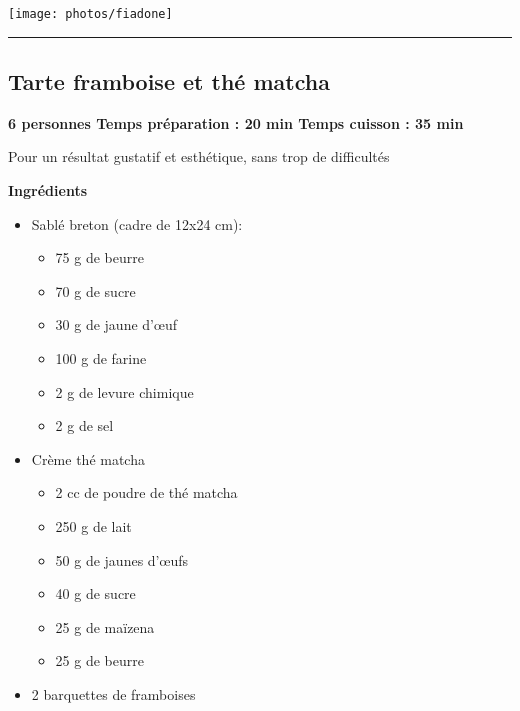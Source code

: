 \documentclass[]{book}
\providecommand{\tightlist}{%
  \setlength{\itemsep}{0pt}\setlength{\parskip}{0pt}}
\begin{document}
\begin{center}\texttt{[image: photos/fiadone]} \end{center}

\begin{center}\rule{0.5\linewidth}{0.5pt}\end{center}

\subsection*{\texorpdfstring{{Tarte framboise et thé
matcha}}{Tarte framboise et thé matcha}}\label{tarte-framboise-et-thuxe9-matcha}

\begin{sucrebox}
\textbf{6 personnes \textbar{} Temps préparation : 20 min \textbar{}
Temps cuisson : 35 min}

Pour un résultat gustatif et esthétique, sans trop de difficultés
\end{sucrebox}

\textbf{Ingrédients}

\begin{itemize}
\tightlist
\item
  Sablé breton (cadre de 12x24 cm):

  \begin{itemize}
  \tightlist
  \item
    75 g de beurre
  \item
    70 g de sucre
  \item
    30 g de jaune d'œuf
  \item
    100 g de farine
  \item
    2 g de levure chimique
  \item
    2 g de sel
  \end{itemize}
\item
  Crème thé matcha

  \begin{itemize}
  \tightlist
  \item
    2 cc de poudre de thé matcha
  \item
    250 g de lait
  \item
    50 g de jaunes d'œufs
  \item
    40 g de sucre
  \item
    25 g de maïzena
  \item
    25 g de beurre
  \end{itemize}
\item
  2 barquettes de framboises
\end{itemize}
\end{document}
